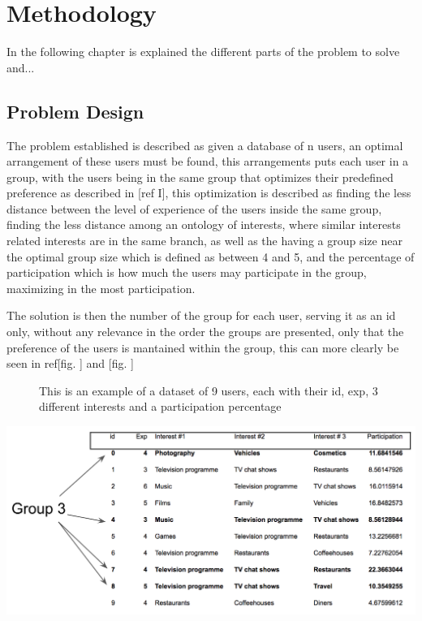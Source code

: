 \chapter{Methodology}
\label{chapter:chapter03}

In the following chapter is explained the different parts of the problem to solve and...

\section{Problem Design}

The problem established is described as given a database of n users, an optimal arrangement of these users must be found, this arrangements puts each user in a group, with the users being in the same group that optimizes their predefined preference as described in [ref I], this optimization is described as finding the less distance between the level of experience of the users inside the same group, finding the less distance among an ontology of interests, where similar interests related interests are in the same branch, as well as the having a group size near the optimal group size which is defined as between 4 and 5, and the percentage of participation which is how much the users may participate in the group, maximizing in the most participation.

The solution is then the number of the group for each user, serving it as an id only, without any relevance in the order the groups are presented, only that the preference of the users is mantained within the group, this can more clearly be seen in ref[fig. ] and [fig. ]

\begin{figure}[dataset]
    \caption{This is an example of a dataset of 9 users, each with their id, exp, 3 different interests and a participation percentage}
    
\end{figure}
\includegraphics{images/dataset_eg.png}


